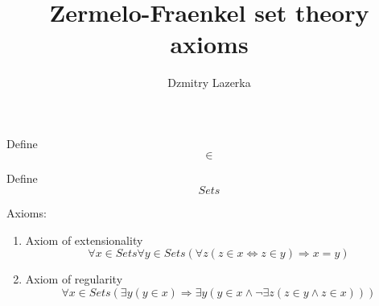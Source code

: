\documentclass{article}
\title{Zermelo-Fraenkel set theory axioms}
\author{Dzmitry Lazerka}
\newenvironment{wikimathdb}[1]{$$}{$$}
\begin{document}
Define
\begin{wikimathdb}{define}
\in
\end{wikimathdb}

Define
\begin{wikimathdb}{define}
Sets
\end{wikimathdb}

Axioms:
\begin{enumerate}
\item
Axiom of extensionality
\begin{wikimathdb}{let}
\forall x \in Sets \forall y \in Sets (\forall z (z \in x
\Leftrightarrow z \in y) \Rightarrow x = y)
\end{wikimathdb}
\item
Axiom of regularity
\begin{wikimathdb}{let}
\forall x \in Sets (\exists y (y \in x) \Rightarrow \exists y (y \in
x \wedge \neg \exists z (z \in y \wedge z \in x)))
\end{wikimathdb}

\end{enumerate}
\end{document}
